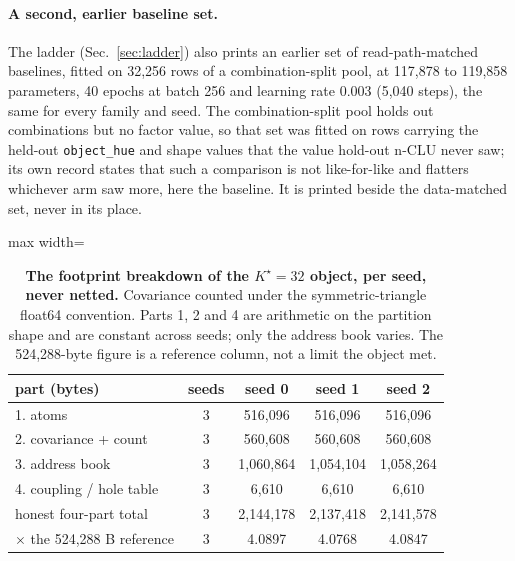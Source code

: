 \documentclass{article} %
\newcommand{\Kstar}{\ensuremath{K^{\star}}}
\begin{document}
\paragraph{A second, earlier baseline set.} The ladder (Sec.~\ref{sec:ladder}) also prints an earlier set
of read-path-matched baselines, fitted on 32,256 rows of a combination-split pool, at 117,878 to %
119,858 parameters, 40 epochs at batch 256 and learning rate 0.003 (5,040 steps), the same for %
every family and seed. %
The combination-split pool holds out combinations but no factor value, so that set was fitted on
rows carrying the held-out \texttt{object\_hue} and shape values that the value hold-out n-CLU never
saw; its own record states that such a comparison is not like-for-like and flatters whichever arm
saw more, here the baseline. It is printed beside the data-matched set, never in its place.

\begin{table}[t]
\centering\small
\caption{\textbf{The footprint breakdown of the $\Kstar=32$ object, per seed, never netted.}
Covariance counted under the symmetric-triangle float64 convention. Parts 1, 2 and 4 are
arithmetic on the partition shape and are constant across seeds; only the address book varies.
The 524,288-byte figure is a reference column, not a limit the object met.}
\label{tab:ledger-kstar}
\begin{adjustbox}{max width=\linewidth}\begin{tabular}{lcccc}
\toprule
part (bytes) & seeds & seed 0 & seed 1 & seed 2 \\
\midrule
1. atoms & 3 & 516,096 & 516,096 & 516,096 \\
2. covariance + count & 3 & 560,608 & 560,608 & 560,608 \\
3. address book & 3 & 1,060,864 & 1,054,104 & 1,058,264 \\
4. coupling / hole table & 3 & 6,610 & 6,610 & 6,610 \\
honest four-part total & 3 & 2,144,178 & 2,137,418 & 2,141,578 \\
$\times$ the 524,288 B reference & 3 & 4.0897 & 4.0768 & 4.0847 \\ %
\bottomrule
\end{tabular}\end{adjustbox}
\end{table}
\end{document}
